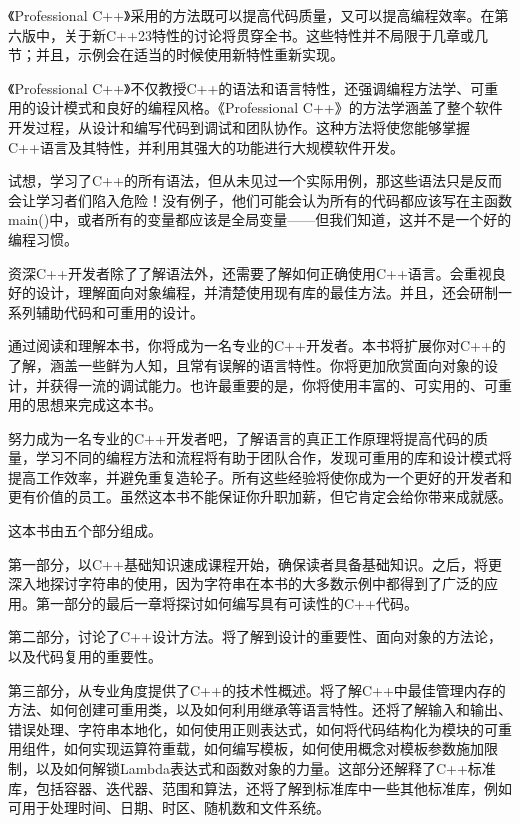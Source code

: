 
《Professional C++》采用的方法既可以提高代码质量，又可以提高编程效率。在第六版中，关于新C++23特性的讨论将贯穿全书。这些特性并不局限于几章或几节；并且，示例会在适当的时候使用新特性重新实现。

《Professional C++》不仅教授C++的语法和语言特性，还强调编程方法学、可重用的设计模式和良好的编程风格。《Professional C++》的方法学涵盖了整个软件开发过程，从设计和编写代码到调试和团队协作。这种方法将使您能够掌握C++语言及其特性，并利用其强大的功能进行大规模软件开发。

试想，学习了C++的所有语法，但从未见过一个实际用例，那这些语法只是反而会让学习者们陷入危险！没有例子，他们可能会认为所有的代码都应该写在主函数main()中，或者所有的变量都应该是全局变量——但我们知道，这并不是一个好的编程习惯。

资深C++开发者除了了解语法外，还需要了解如何正确使用C++语言。会重视良好的设计，理解面向对象编程，并清楚使用现有库的最佳方法。并且，还会研制一系列辅助代码和可重用的设计。

通过阅读和理解本书，你将成为一名专业的C++开发者。本书将扩展你对C++的了解，涵盖一些鲜为人知，且常有误解的语言特性。你将更加欣赏面向对象的设计，并获得一流的调试能力。也许最重要的是，你将使用丰富的、可实用的、可重用的思想来完成这本书。

努力成为一名专业的C++开发者吧，了解语言的真正工作原理将提高代码的质量，学习不同的编程方法和流程将有助于团队合作，发现可重用的库和设计模式将提高工作效率，并避免重复造轮子。所有这些经验将使你成为一个更好的开发者和更有价值的员工。虽然这本书不能保证你升职加薪，但它肯定会给你带来成就感。


这本书由五个部分组成。

第一部分，以C++基础知识速成课程开始，确保读者具备基础知识。之后，将更深入地探讨字符串的使用，因为字符串在本书的大多数示例中都得到了广泛的应用。第一部分的最后一章将探讨如何编写具有可读性的C++代码。

第二部分，讨论了C++设计方法。将了解到设计的重要性、面向对象的方法论，以及代码复用的重要性。

第三部分，从专业角度提供了C++的技术性概述。将了解C++中最佳管理内存的方法、如何创建可重用类，以及如何利用继承等语言特性。还将了解输入和输出、错误处理、字符串本地化，如何使用正则表达式，如何将代码结构化为模块的可重用组件，如何实现运算符重载，如何编写模板，如何使用概念对模板参数施加限制，以及如何解锁Lambda表达式和函数对象的力量。这部分还解释了C++标准库，包括容器、迭代器、范围和算法，还将了解到标准库中一些其他标准库，例如可用于处理时间、日期、时区、随机数和文件系统。

